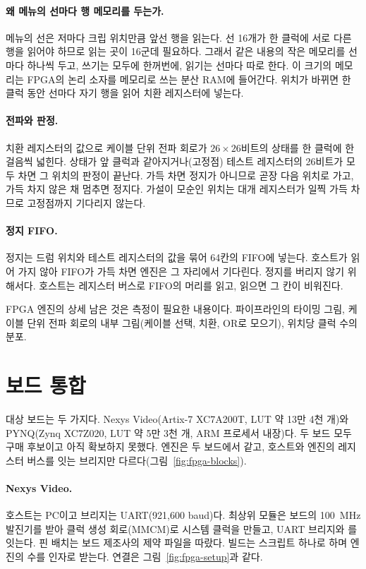 \paragraph{왜 메뉴의 선마다 행 메모리를 두는가.} 메뉴의 선은 저마다 크립 위치만큼 앞선 행을 읽는다. 선
16개가 한 클럭에 서로 다른 행을 읽어야 하므로 읽는 곳이 16군데 필요하다. 그래서 같은 내용의 작은 메모리를
선마다 하나씩 두고, 쓰기는 모두에 한꺼번에, 읽기는 선마다 따로 한다. 이 크기의 메모리는 FPGA의 논리 소자를
메모리로 쓰는 분산 RAM에 들어간다. 위치가 바뀌면 한 클럭 동안 선마다 자기 행을 읽어 치환 레지스터에 넣는다.

\paragraph{전파와 판정.} 치환 레지스터의 값으로 케이블 단위 전파 회로가 $26 \times 26$비트의 상태를 한 클럭에
한 걸음씩 넓힌다. 상태가 앞 클럭과 같아지거나(고정점) 테스트 레지스터의 26비트가 모두 차면 그 위치의 판정이
끝난다. 가득 차면 정지가 아니므로 곧장 다음 위치로 가고, 가득 차지 않은 채 멈추면 정지다. 가설이 모순인
위치는 대개 레지스터가 일찍 가득 차므로 고정점까지 기다리지 않는다.

\paragraph{정지 FIFO.} 정지는 드럼 위치와 테스트 레지스터의 값을 묶어 64칸의 FIFO에 넣는다. 호스트가 읽어
가지 않아 FIFO가 가득 차면 엔진은 그 자리에서 기다린다. 정지를 버리지 않기 위해서다. 호스트는 레지스터 버스로
FIFO의 머리를 읽고, 읽으면 그 칸이 비워진다.

\begin{todobox}{FPGA 엔진의 상세}
남은 것은 측정이 필요한 내용이다. 파이프라인의 타이밍 그림, 케이블 단위 전파 회로의 내부 그림(케이블 선택,
치환, OR로 모으기), 위치당 클럭 수의 분포.
\end{todobox}

\section{보드 통합}\label{sec:fpga-board}

대상 보드는 두 가지다. Nexys Video(Artix-7 XC7A200T, LUT 약 13만 4천 개)와 PYNQ(Zynq XC7Z020, LUT 약 5만 3천 개,
ARM 프로세서 내장)다. 두 보드 모두 구매 후보이고 아직 확보하지 못했다. 엔진은 두 보드에서 같고, 호스트와
엔진의 레지스터 버스를 잇는 브리지만 다르다(그림~\ref{fig:fpga-blocks}).

\paragraph{Nexys Video.} 호스트는 PC이고 브리지는 UART(921,600 baud)다. 최상위 모듈은 보드의 100~MHz 발진기를
받아 클럭 생성 회로(MMCM)로 시스템 클럭을 만들고, UART 브리지와 를 잇는다. 핀 배치는
보드 제조사의 제약 파일을 따랐다. 빌드는 스크립트 하나로 하며 엔진의 수를 인자로 받는다.
연결은 그림~\ref{fig:fpga-setup}과 같다.

